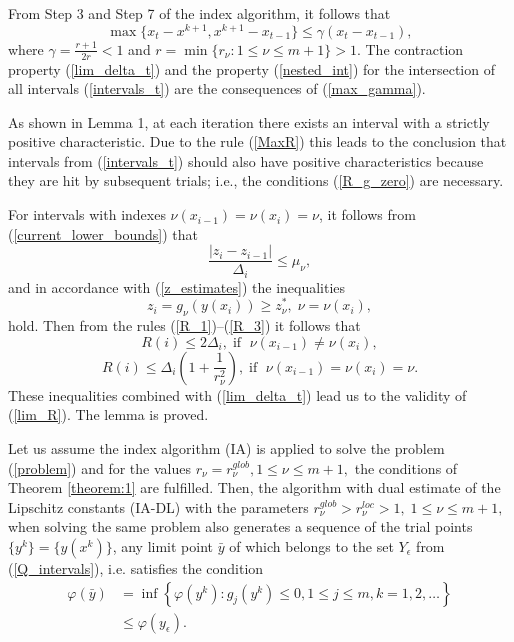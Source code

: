 \documentclass[twocolumn]{svjour3}          %
\begin{document}
From Step 3 and Step 7 of the index algorithm, it follows that
\begin{equation}\label{max_gamma}
\max \{x_t-x^{k+1},x^{k+1}-x_{t-1}\} \leq \gamma (x_t-x_{t-1}),
\end{equation}
where $\gamma = \frac{r+1}{2r}<1$  and $ r=\min\{r_\nu:1\leq\nu\leq m+1\}>1$.
The contraction property (\ref{lim_delta_t}) and the property (\ref{nested_int}) for the intersection of all intervals (\ref{intervals_t}) are the consequences of (\ref{max_gamma}).

As shown in Lemma 1, at each iteration there exists an interval with a strictly positive characteristic. Due to the rule (\ref{MaxR}) this leads to the conclusion that
intervals from (\ref{intervals_t}) should also have positive characteristics because they are hit by subsequent trials; i.e., the conditions (\ref{R_g_zero}) are necessary.


For intervals with indexes $\nu(x_{i-1}) = \nu(x_{i}) = \nu$, it follows from (\ref{current_lower_bounds}) that
\[
\frac{\left|z_i-z_{i-1}\right|}{\Delta_i}\leq \mu_\nu,
\]
and in accordance with (\ref{z_estimates}) the inequalities 
\[
z_i = g_\nu(y(x_i))\geq z_\nu^*, \; \nu=\nu(x_i),
\]
hold. Then from the rules (\ref{R_1})--(\ref{R_3}) it follows that 
\[
R(i) \leq 2\Delta_i, \; \text{if } \; \nu(x_{i-1}) \neq \nu(x_{i}),
\]
\[
R(i) \leq \Delta_i\left(1+\frac{1}{r_\nu^2}\right), \; \text{if } \; \nu(x_{i-1}) = \nu(x_{i}) = \nu.
\]
These inequalities combined with (\ref{lim_delta_t}) lead us to the validity of (\ref{lim_R}).
The lemma is proved.

	
	
\begin{theorem}\label{theorem:2} Let us assume the index algorithm (IA) is applied to solve the problem (\ref{problem}) and for the values $r_{\nu}=r_{\nu}^{glob}, 1 \leq \nu \leq m+1,$ the conditions of Theorem \ref{theorem:1} are fulfilled. Then, the algorithm with dual estimate of the Lipschitz constants (IA-DL) with the parameters $r_{\nu}^{glob}>r_{\nu}^{loc}>1,\; 1\leq \nu \leq m+1,$ when solving the same problem also generates a sequence of the trial points $\{y^k\}=\{y(x^k)\}$, any limit point $\bar{y}$ of which belongs to the set $Y_{\epsilon}$ from (\ref{Q_intervals}), i.e. satisfies the condition 
\begin{align}\label{phi_bar_y}
	\varphi(\bar y) & = \inf\left\{\varphi(y^k):g_j(y^k) \leq 0, 1 \leq j \leq m, k = 1,2,\ldots \right\} \nonumber \\
	& \leq \varphi(y_{\epsilon}).
\end{align}
\end{theorem}
\end{document}
